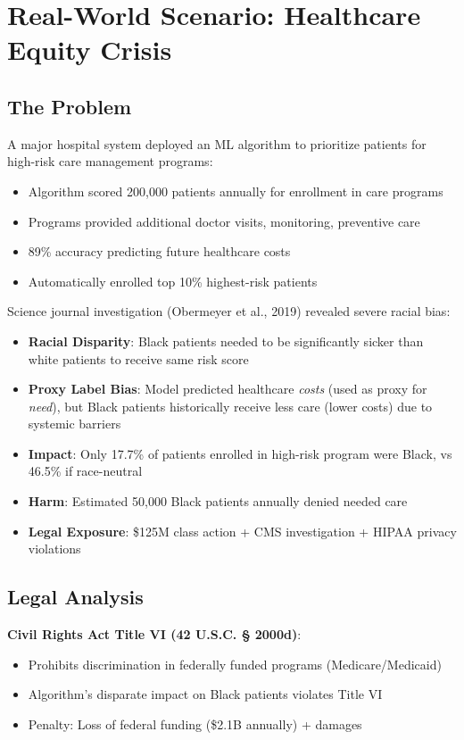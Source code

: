 \section{Real-World Scenario: Healthcare Equity Crisis}

\subsection{The Problem}

A major hospital system deployed an ML algorithm to prioritize patients for high-risk care management programs:

\begin{itemize}
    \item Algorithm scored 200,000 patients annually for enrollment in care programs
    \item Programs provided additional doctor visits, monitoring, preventive care
    \item 89\% accuracy predicting future healthcare costs
    \item Automatically enrolled top 10\% highest-risk patients
\end{itemize}

Science journal investigation (Obermeyer et al., 2019) revealed severe racial bias:
\begin{itemize}
    \item \textbf{Racial Disparity}: Black patients needed to be significantly sicker than white patients to receive same risk score
    \item \textbf{Proxy Label Bias}: Model predicted healthcare \textit{costs} (used as proxy for \textit{need}), but Black patients historically receive less care (lower costs) due to systemic barriers
    \item \textbf{Impact}: Only 17.7\% of patients enrolled in high-risk program were Black, vs 46.5\% if race-neutral
    \item \textbf{Harm}: Estimated 50,000 Black patients annually denied needed care
    \item \textbf{Legal Exposure}: \$125M class action + CMS investigation + HIPAA privacy violations
\end{itemize}

\subsection{Legal Analysis}

\textbf{Civil Rights Act Title VI (42 U.S.C. § 2000d)}:
\begin{itemize}
    \item Prohibits discrimination in federally funded programs (Medicare/Medicaid)
    \item Algorithm's disparate impact on Black patients violates Title VI
    \item Penalty: Loss of federal funding (\$2.1B annually) + damages
\end{itemize}

